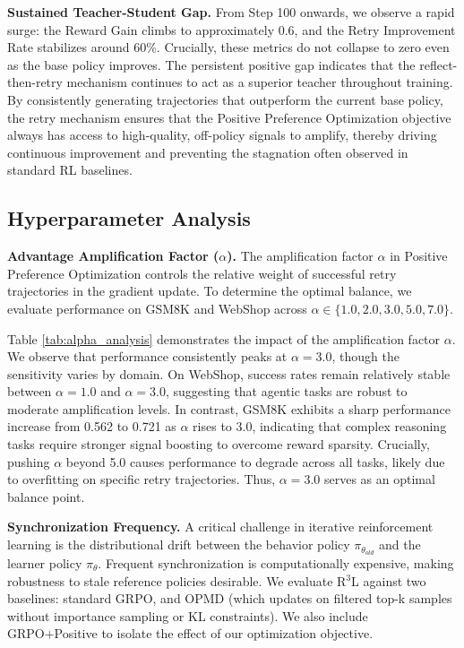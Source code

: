 \documentclass[11pt]{article}
\begin{document}
\textbf{Sustained Teacher-Student Gap.} From Step 100 onwards, we observe a rapid surge: the Reward Gain climbs to approximately 0.6, and the Retry Improvement Rate stabilizes around 60\%. Crucially, these metrics do not collapse to zero even as the base policy improves. The persistent positive gap indicates that the reflect-then-retry mechanism continues to act as a superior teacher throughout training. By consistently generating trajectories that outperform the current base policy, the retry mechanism ensures that the Positive Preference Optimization objective always has access to high-quality, off-policy signals to amplify, thereby driving continuous improvement and preventing the stagnation often observed in standard RL baselines.

\subsection{Hyperparameter Analysis}
\label{sec:hyperparam}

\textbf{Advantage Amplification Factor ($\alpha$).}
The amplification factor $\alpha$ in Positive Preference Optimization controls the relative weight of successful retry trajectories in the gradient update. To determine the optimal balance, we evaluate performance on GSM8K and WebShop across $\alpha \in \{1.0, 2.0, 3.0, 5.0, 7.0\}$.



Table \ref{tab:alpha_analysis} demonstrates the impact of the amplification factor $\alpha$. We observe that performance consistently peaks at $\alpha=3.0$, though the sensitivity varies by domain. On WebShop, success rates remain relatively stable between $\alpha=1.0$ and $\alpha=3.0$, suggesting that agentic tasks are robust to moderate amplification levels. In contrast, GSM8K exhibits a sharp performance increase from 0.562 to 0.721 as $\alpha$ rises to 3.0, indicating that complex reasoning tasks require stronger signal boosting to overcome reward sparsity. Crucially, pushing $\alpha$ beyond 5.0 causes performance to degrade across all tasks, likely due to overfitting on specific retry trajectories. Thus, $\alpha=3.0$ serves as an optimal balance point.

\textbf{Synchronization Frequency.}
A critical challenge in iterative reinforcement learning is the distributional drift between the behavior policy $\pi_{\theta_{old}}$ and the learner policy $\pi_{\theta}$. Frequent synchronization is computationally expensive, making robustness to stale reference policies desirable. We evaluate R$^3$L against two baselines: standard GRPO, and OPMD (which updates on filtered top-k samples without importance sampling or KL constraints). We also include GRPO+Positive to isolate the effect of our optimization objective.
\end{document}
